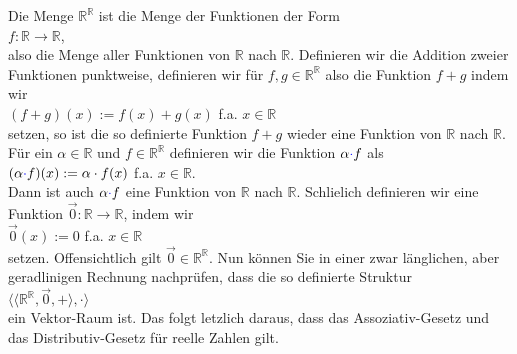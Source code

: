 \example
Die Menge $\mathbb{R}^{\mathbb{R}}$ ist die Menge der Funktionen der Form
\\[0.2cm]
\hspace*{1.3cm}
 $f: \mathbb{R} \rightarrow \mathbb{R}$,
\\[0.2cm]
also die Menge aller Funktionen von $\mathbb{R}$ nach $\mathbb{R}$.
Definieren wir die Addition zweier Funktionen punktweise, definieren wir f\"{u}r $f,g \in \mathbb{R}^{\mathbb{R}}$ also die
Funktion $f+g$ indem wir
\\[0.2cm]
\hspace*{1.3cm}
$(f+g)(x) := f(x) + g(x)$  \quad f.a. $x \in \mathbb{R}$
\\[0.2cm]
setzen, so ist die so definierte Funktion $f + g$ wieder eine Funktion von
$\mathbb{R}$ nach $\mathbb{R}$.  F\"{u}r ein $\alpha \in \mathbb{R}$ und $f
\in\mathbb{R}^{\mathbb{R}}$ definieren wir die Funktion
$\alpha {\color{blue}{\cdot}} f$ als
\\[0.2cm]
\hspace*{1.3cm}
$(\alpha {\color{blue}{\cdot}} f)(x) := \alpha \cdot f(x)$ \quad f.a. $x \in \mathbb{R}$.
\\[0.2cm]
Dann ist auch  $\alpha {\color{blue}{\cdot}} f$ eine Funktion von $\mathbb{R}$ nach $\mathbb{R}$.  
Schlie\3lich definieren wir eine Funktion
 $\vec{0}:\mathbb{R} \rightarrow \mathbb{R}$, indem wir
\\[0.2cm]
\hspace*{1.3cm}
$\vec{0}(x) := 0$ \quad f.a. $x \in \mathbb{R}$ 
\\[0.2cm]
setzen.  Offensichtlich  gilt $\vec{0} \in \mathbb{R}^{\mathbb{R}}$.  Nun k\"{o}nnen Sie
in einer zwar l\"{a}nglichen, aber geradlinigen Rechnung nachpr\"{u}fen, dass die so definierte Struktur
\\[0.2cm]
\hspace*{1.3cm}
$\bigl\langle \langle \mathbb{R}^{\mathbb{R}}, \vec{0}, + \rangle, \cdot \bigr\rangle$
\\[0.2cm]
ein Vektor-Raum ist.  Das folgt letzlich daraus, dass das Assoziativ-Gesetz und das Distributiv-Gesetz f\"{u}r reelle Zahlen
gilt.
 \eoxs


